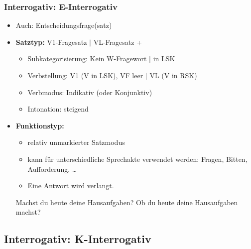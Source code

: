 \begin{frame}
\frametitle{Interrogativ: E-Interrogativ}

\begin{itemize}
	\item Auch: Entscheidungsfrage(satz)
	\item \textbf{Satztyp:} V1-Fragesatz $|$ VL-Fragesatz + 
	\begin{itemize}
		\item Subkategorisierung: Kein W-Fragewort $|$  in LSK
		\item Verbstellung: V1 (V in LSK), VF leer $|$  VL (V in RSK)
		\item Verbmodus: Indikativ (oder Konjunktiv)
		\item Intonation: steigend
	\end{itemize}
	\item \textbf{Funktionstyp:}
	\begin{itemize}
		\item relativ unmarkierter Satzmodus
		\item kann für unterschiedliche Sprechakte verwendet werden: Fragen, Bitten, Aufforderung, \dots
		\item Eine Antwort wird verlangt.
	\end{itemize}
	
	\eal
	\ex Machst du heute deine Hausaufgaben?
	\ex Ob du heute deine Hausaufgaben machst?
	\zl
	
\end{itemize}

\end{frame}


\subsection{Interrogativ: K-Interrogativ}


